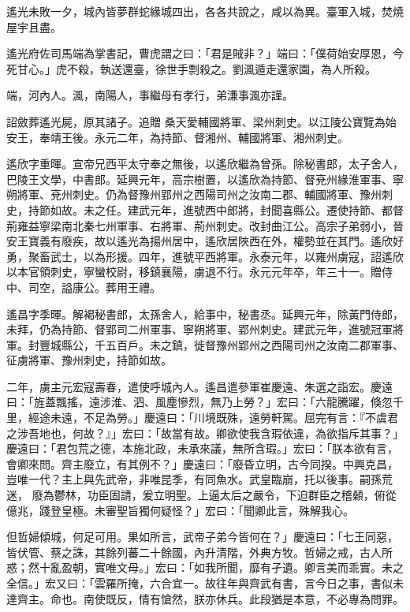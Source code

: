 \begin{pinyinscope}
 遙光未敗一夕，城內皆夢群蛇緣城四出，各各共說之，咸以為異。臺軍入城，焚燒屋宇且盡。



 遙光府佐司馬端為掌書記，曹虎謂之曰：「君是賊非？」端曰：「僕荷始安厚恩，今死甘心。」虎不殺，執送還臺，徐世手剽殺之。劉渢遁走還家園，為人所殺。



 端，河內人。渢，南陽人，事繼母有孝行，弟溓事渢亦謹。



 詔斂葬遙光屍，原其諸子。追贈
 桑天愛輔國將軍、梁州刺史。以江陵公寶覽為始安王，奉靖王後。永元二年，為持節、督湘州、輔國將軍、湘州刺史。



 遙欣字重暉。宣帝兄西平太守奉之無後，以遙欣繼為曾孫。除秘書郎，太子舍人，巴陵王文學，中書郎。延興元年，高宗樹置，以遙欣為持節、督兗州緣淮軍事、寧朔將軍、兗州刺史。仍為督豫州郢州之西陽司州之汝南二郡、輔國將軍、豫州刺史，持節如故。未之任。建武元年，進號西中郎將，封聞喜縣公。遷使持節、都督荊雍益寧梁南北秦七州軍事、右將軍、荊州刺史。改封曲江公。高宗子弟弱小，晉安王寶義有廢疾，故以遙光為揚州居中，遙欣居陜西在外，權勢並在其門。遙欣好勇，聚畜武士，以為形援。四年，進號平西將軍。永泰元年，以雍州虜寇，詔遙欣以本官領刺史，寧蠻校尉，移鎮襄陽，虜退不行。永元元年卒，年三十一。贈侍中、司空，謚康公。葬用王禮。



 遙昌字季暉。解褐秘書郎，太孫舍人，給事中，秘書丞。延興元年，除黃門侍郎，未拜，仍為持節、督郢司二州軍事、寧朔將軍、郢州刺史。建武元年，進號冠軍將軍。封豐城縣公，千五百戶。未之鎮，徙督豫州郢州之西陽司州之汝南二郡軍事、征虜將軍、豫州刺史，持節如故。



 二年，虜主元宏寇壽春，遣使呼城內人。遙昌遣參軍崔慶遠、朱選之詣宏。慶遠曰：「旌蓋飄搖，遠涉淮、泗、風塵慘烈，無乃上勞？」宏曰：「六龍騰躍，倏忽千里，經途未遠，不足為勞。」慶遠曰：「川境既殊，遠勞軒駕。屈完有言：『不虞君之涉吾地也，何故？』」宏曰：「故當有故。卿欲使我含瑕依違，為欲指斥其事？」慶遠曰：「君包荒之德，本施北政，未承來議，無所含瑕。」宏曰：「朕本欲有言，會卿來問。齊主廢立，有其例不？」慶遠曰：「廢昏立明，古今同揆。中興克昌，豈唯一代？主上與先武帝，非唯昆季，有同魚水。武皇臨崩，托以後事。嗣孫荒迷，
 廢為鬱林，功臣固請，爰立明聖。上逼太后之嚴令，下迫群臣之稽顙，俯從億兆，踐登皇極。未審聖旨獨何疑怪？」宏曰：「聞卿此言，殊解我心。



 但哲婦傾城，何足可用。果如所言，武帝子弟今皆何在？」慶遠曰：「七王同惡，皆伏管、蔡之誅，其餘列蕃二十餘國，內升清階，外典方牧。哲婦之戒，古人所惑；然十亂盈朝，實唯文母。」宏曰：「如我所聞，靡有孑遺。卿言美而乖實。未之全信。」宏又曰：「雲羅所掩，六合宜一。故往年與齊武有書，言今日之事，書似未達齊主。命也。南使既反，情有愴然，朕亦休兵。此段猶是本意，不必專為問罪。




\end{pinyinscope}
